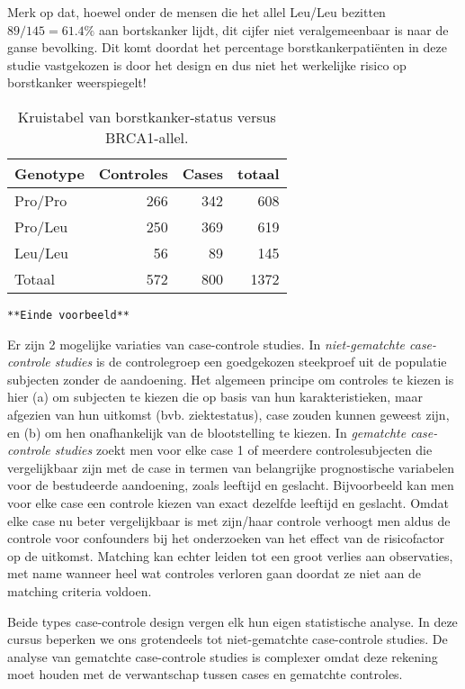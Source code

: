 \documentclass[12pt,dutch,coursenotes]{book}
\theoremstyle{definition}
\theoremstyle{definition}
\theoremstyle{definition}
\theoremstyle{remark}
\begin{document}
Merk op dat, hoewel onder de mensen die het allel Leu/Leu bezitten
\(89/145=61.4\%\) aan bortskanker lijdt, dit cijfer niet veralgemeenbaar
is naar de ganse bevolking. Dit komt doordat het percentage
borstkankerpatiënten in deze studie vastgekozen is door het design en
dus niet het werkelijke risico op borstkanker weerspiegelt!

\begin{table}

\caption{\label{tab:leu}Kruistabel van borstkanker-status versus BRCA1-allel.}
\centering
\begin{tabular}[t]{lrrr}
\toprule
Genotype & Controles & Cases & totaal\\
\midrule
Pro/Pro & 266 & 342 & 608\\
Pro/Leu & 250 & 369 & 619\\
Leu/Leu & 56 & 89 & 145\\
Totaal & 572 & 800 & 1372\\
\bottomrule
\end{tabular}
\end{table}

\texttt{**Einde\ voorbeeld**}

Er zijn 2 mogelijke variaties van case-controle studies. In
\emph{niet-gematchte case-controle studies} is de controlegroep een
goedgekozen steekproef uit de populatie subjecten zonder de aandoening.
Het algemeen principe om controles te kiezen is hier (a) om subjecten te
kiezen die op basis van hun karakteristieken, maar afgezien van hun
uitkomst (bvb. ziektestatus), case zouden kunnen geweest zijn, en (b) om
hen onafhankelijk van de blootstelling te kiezen. In \emph{gematchte
case-controle studies} zoekt men voor elke case 1 of meerdere
controlesubjecten die vergelijkbaar zijn met de case in termen van
belangrijke prognostische variabelen voor de bestudeerde aandoening,
zoals leeftijd en geslacht. Bijvoorbeeld kan men voor elke case een
controle kiezen van exact dezelfde leeftijd en geslacht. Omdat elke case
nu beter vergelijkbaar is met zijn/haar controle verhoogt men aldus de
controle voor confounders bij het onderzoeken van het effect van de
risicofactor op de uitkomst. Matching kan echter leiden tot een groot
verlies aan observaties, met name wanneer heel wat controles verloren
gaan doordat ze niet aan de matching criteria voldoen.

Beide types case-controle design vergen elk hun eigen statistische
analyse. In deze cursus beperken we ons grotendeels tot niet-gematchte
case-controle studies. De analyse van gematchte case-controle studies is
complexer omdat deze rekening moet houden met de verwantschap tussen
cases en gematchte controles.
\end{document}
